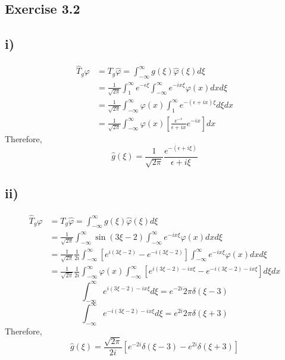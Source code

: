 \documentclass[a4paper, 11pt]{article}
\begin{document}
\begin{spacing}{1.5}
\section*{Exercise 3.2}
\subsection*{i)}
\begin{align*}
\hat{T}_g \varphi
	& = T_g \hat{\varphi} = \int_{-\infty}^{\infty}g(\xi)\hat{\varphi}(\xi)d\xi \\ 
	& = \frac{1}{\sqrt{2\pi}} \int_{1}^{\infty} e^{-\epsilon\xi} \int_{-\infty}^{\infty} e^{-ix\xi}\varphi(x)dxd\xi \\
	& = \frac{1}{\sqrt{2\pi}} \int_{-\infty}^{\infty} \varphi(x) \int_{1}^{\infty} e^{-(\epsilon+ix)\xi}d\xi dx \\
	& = \frac{1}{\sqrt{2\pi}} \int_{-\infty}^{\infty} \varphi(x) \left[ \frac{e^{-\epsilon}}{\epsilon+ix}e^{-ix}\right]dx
\end{align*}
Therefore, 
$$
\hat{g} (\xi) =\frac{1}{\sqrt{2\pi}} \frac{e^{-(\epsilon+i\xi)}}{\epsilon+i\xi}
$$

\subsection*{ii)}
\begin{align*}
\hat{T}_g \varphi
	& = T_g \hat{\varphi} = \int_{-\infty}^{\infty}g(\xi)\hat{\varphi}(\xi)d\xi \\ 
	& = \frac{1}{\sqrt{2\pi}} \int_{-\infty}^{\infty} \sin(3\xi-2) \int_{-\infty}^{\infty} e^{-ix\xi}\varphi(x)dxd\xi \\
	& = \frac{1}{\sqrt{2\pi}} \frac{1}{2i} \int_{-\infty}^{\infty} \left[e^{i(3\xi-2)} - e^{-i(3\xi-2)}\right] \int_{-\infty}^{\infty} e^{-ix\xi}\varphi(x)dxd\xi \\
	& = \frac{1}{\sqrt{2\pi}} \frac{1}{2i} \int_{-\infty}^{\infty} \varphi(x) \int_{-\infty}^{\infty} \left[e^{i(3\xi-2) - ix\xi} - e^{-i(3\xi-2)-ix\xi} \right]d\xi dx
\end{align*}
$$
\int_{-\infty}^{\infty} e^{i(3\xi-2) - ix\xi}d\xi = e^{-2i} 2\pi \delta(\xi-3)
$$
$$
\int_{-\infty}^{\infty}e^{-i(3\xi-2)-ix\xi}d\xi = e^{2i} 2\pi \delta(\xi+3)
$$
Therefore,
$$
\hat{g} (\xi) = \frac{\sqrt{2\pi}}{2i} \left[e^{-2i}\delta(\xi-3) -e^{2i}\delta(\xi+3) \right]
$$


\end{spacing}
\end{document}
